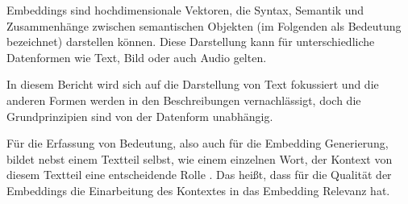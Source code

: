 \documentclass[../main.tex]{subfiles}
\begin{document}
Embeddings sind hochdimensionale Vektoren, die Syntax, Semantik und Zusammenhänge zwischen semantischen Objekten (im Folgenden als Bedeutung bezeichnet) darstellen können.
Diese Darstellung kann für unterschiedliche Datenformen wie Text, Bild oder auch Audio gelten.
\cite{mikolov2013efficient}

In diesem Bericht wird sich auf die Darstellung von Text fokussiert und die anderen Formen werden in den Beschreibungen vernachlässigt, doch die Grundprinzipien sind von der Datenform unabhängig.

Für die Erfassung von Bedeutung, also auch für die Embedding Generierung, bildet nebst einem Textteil selbst, wie einem einzelnen Wort, der Kontext von diesem Textteil eine entscheidende Rolle \cite{rubenstein1965contextual}.
Das heißt, dass für die Qualität der Embeddings die Einarbeitung des Kontextes in das Embedding Relevanz hat.
\cite{huang-etal-2012-improving}
\end{document}
